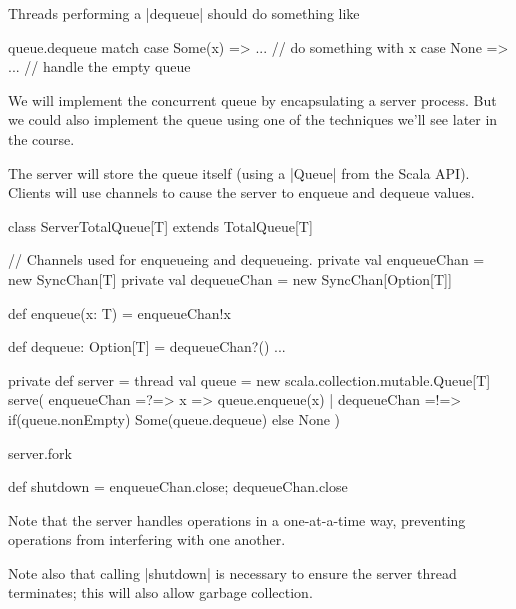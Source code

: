 
\begin{slide}

Threads performing a |dequeue| should do something like
\begin{scala}
  queue.dequeue match{
    case Some(x) => ... // do something with x
    case None => ... // handle the empty queue
  }
\end{scala}
\end{slide}


\begin{slide}

We will implement the concurrent queue by encapsulating a server process.
But we could also implement the queue using one of the techniques we'll see
later in the course.

The server will store the queue itself (using a |Queue| from the Scala API).
Clients will use channels to cause the server to enqueue and dequeue values.

\begin{scala}
class ServerTotalQueue[T] extends TotalQueue[T]{
  // Channels used for enqueueing and dequeueing.
  private val enqueueChan = new SyncChan[T]
  private val dequeueChan = new SyncChan[Option[T]]

  def enqueue(x: T) = enqueueChan!x

  def dequeue: Option[T] = dequeueChan?()
  ...
}
\end{scala}
\end{slide}


\begin{slide}

\begin{scala}
  private def server = thread{
    val queue = new scala.collection.mutable.Queue[T]
    serve(
      enqueueChan =?=> { x => queue.enqueue(x) }
      | dequeueChan =!=> { if(queue.nonEmpty) Some(queue.dequeue) else None }
    )
  }

  server.fork

  def shutdown = { enqueueChan.close; dequeueChan.close }
\end{scala}

Note that the server handles operations in a one-at-a-time way, preventing
operations from interfering with one another.

Note also that calling |shutdown| is necessary to ensure the server thread
terminates; this will also allow garbage collection. 
\end{slide}


